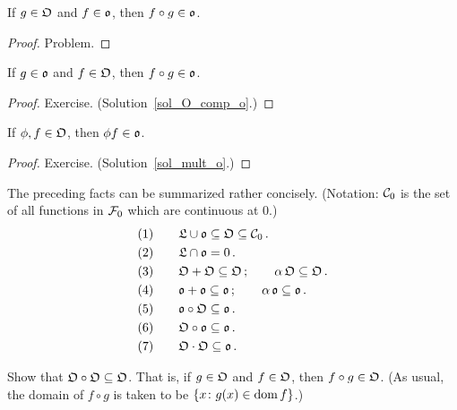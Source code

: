 \begin{prop} If $g \in \mathfrak{O}$ and $f \in \mathfrak{o}$, then $f \circ g \in \mathfrak{o}$.
\end{prop}

\begin{proof} Problem. \ns \end{proof}

\begin{prop}\label{O_comp_o} If $g \in \mathfrak{o}$ and $f \in \mathfrak{O}$, then $f \circ g \in \mathfrak{o}$.
\end{prop}

\begin{proof} Exercise.   (Solution~\ref{sol_O_comp_o}.)   \ns \end{proof}

\begin{prop}\label{mult_o} If $\phi,f \in \mathfrak{O}$, then $\phi f \in \mathfrak{o}$.
\end{prop}

\begin{proof} Exercise.  (Solution~\ref{sol_mult_o}.)   \ns \end{proof}

\begin{rem}\label{rem_oO_R} The preceding facts can be summarized rather concisely. (Notation:
$\mathcal{C}_0$ is the set of all functions in $\mathcal{F}_0$ which are continuous at 0.)
 \begin{align*}
   &(1)\qquad \mathfrak{L} \cup \mathfrak{o} \subseteq \mathfrak{O} \subseteq
                   \mathcal{C}_0 \, .\\
   &(2)\qquad \mathfrak{L} \cap \mathfrak{o} = {0}\,. \\
   &(3)\qquad \mathfrak{O} + \mathfrak{O} \subseteq \mathfrak{O}\,; \qquad
                    \alpha\,\mathfrak{O} \subseteq \mathfrak{O}\,. \\
   &(4)\qquad \mathfrak{o} + \mathfrak{o} \subseteq \mathfrak{o}\,; \qquad
                    \alpha\,\mathfrak{o} \subseteq \mathfrak{o}\,. \\
   &(5)\qquad \mathfrak{o} \circ \mathfrak{O} \subseteq \mathfrak{o}\,. \\
   &(6)\qquad \mathfrak{O} \circ \mathfrak{o} \subseteq \mathfrak{o}\,. \\
   &(7)\qquad \mathfrak{O} \cdot \mathfrak{O} \subseteq \mathfrak{o}\,.
 \end{align*}
\end{rem}

\begin{prob}\label{O_comp_O} Show that $\mathfrak{O}\circ\mathfrak{O}\subseteq\mathfrak{O}$.  That is, if
$g \in \mathfrak{O}$ and $f \in \mathfrak{O}$, then $f\circ g \in \mathfrak{O}$. (As usual, the domain of $f
\circ g$ is taken to be $\{x \colon g(x) \in \operatorname{dom} f\}$.)
\end{prob}






